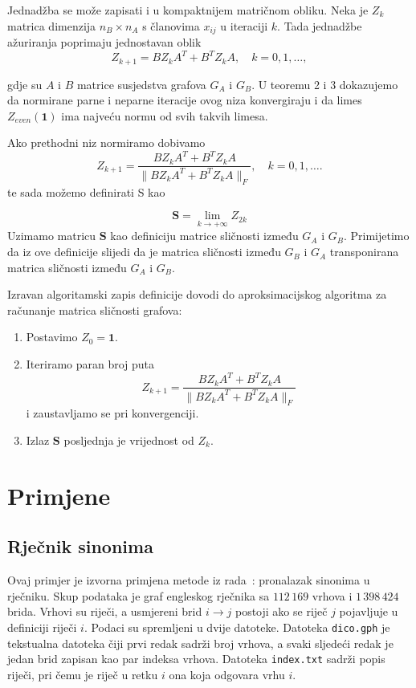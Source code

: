 \documentclass[12pt, letterpaper]{article}
\numberwithin{figure}{section}
\begin{document}
Jednadžba se može zapisati i u kompaktnijem matričnom obliku. Neka je $Z_k$ matrica dimenzija $n_B \times n_A$ s članovima $x_{ij}$ u iteraciji $k$. Tada jednadžbe ažuriranja poprimaju jednostavan oblik
\begin{equation}
Z_{k+1} = B Z_k A^T + B^T Z_k A, \quad k = 0, 1, \dots,
\end{equation}

gdje su $A$ i $B$ matrice susjedstva grafova $G_A$ i $G_B$. U teoremu 2 i 3 dokazujemo da normirane parne i neparne iteracije ovog niza konvergiraju i da limes $Z_{even}(\mathbf{1})$ ima najveću normu od svih takvih limesa.

Ako prethodni niz normiramo dobivamo
\[
Z_{k+1} = \frac{B Z_k A^T + B^T Z_k A}{\|B Z_k A^T + B^T Z_k A\|_F}, \quad k = 0, 1, \dots.
\]
te sada možemo definirati S kao

\[
\mathbf{S} = \lim_{k \to +\infty} Z_{2k}
\]
Uzimamo matricu $\mathbf{S}$ kao definiciju matrice sličnosti između $G_A$ i $G_B$. Primijetimo da iz ove definicije slijedi da je matrica sličnosti između $G_B$ i $G_A$ transponirana matrica sličnosti između $G_A$ i $G_B$.

Izravan algoritamski zapis definicije dovodi do aproksimacijskog algoritma za računanje matrica sličnosti grafova:
\begin{enumerate}
    \item Postavimo $Z_0 = \mathbf{1}$.
    \item Iteriramo paran broj puta
    \[
    Z_{k+1} = \frac{B Z_k A^T + B^T Z_k A}{\|B Z_k A^T + B^T Z_k A\|_F}
    \]
    i zaustavljamo se pri konvergenciji.
    \item Izlaz $\mathbf{S}$ posljednja je vrijednost od $Z_k$.
\end{enumerate}
\section{Primjene}
\subsection{Rječnik sinonima}

Ovaj primjer je izvorna primjena metode iz rada~\cite{blondel2004similarity}: pronalazak sinonima u rječniku. Skup podataka je graf engleskog rječnika sa $112\,169$ vrhova i $1\,398\,424$ brida. Vrhovi su riječi, a usmjereni brid $i\to j$ postoji ako se riječ $j$ pojavljuje u definiciji riječi $i$. Podaci su spremljeni u dvije datoteke. Datoteka \texttt{dico.gph} je tekstualna datoteka čiji prvi redak sadrži broj vrhova, a svaki sljedeći redak je jedan brid zapisan kao par indeksa vrhova. Datoteka \texttt{index.txt} sadrži popis riječi, pri čemu je riječ u retku $i$ ona koja odgovara vrhu $i$. 
\end{document}

